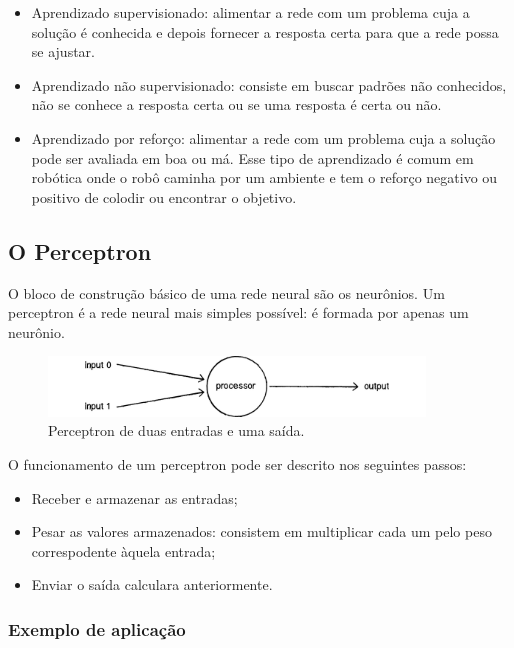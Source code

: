 \begin{itemize}
\item
  Aprendizado supervisionado: alimentar a rede com um problema cuja a solução é conhecida
  e depois fornecer a resposta certa para que a rede possa se ajustar.
\item
  Aprendizado não supervisionado: consiste em buscar padrões não conhecidos, não se conhece
  a resposta certa ou se uma resposta é certa ou não.
\item
  Aprendizado por reforço: alimentar a rede com um problema cuja a solução pode ser avaliada
  em boa ou má. Esse tipo de aprendizado é comum em robótica onde o robô caminha por um ambiente
  e tem o reforço negativo ou positivo de colodir ou encontrar o objetivo.
\end{itemize}

\subsection{O Perceptron}

O bloco de construção básico de uma rede neural são os neurônios. Um perceptron é a rede
neural mais simples possível: é formada por apenas um neurônio.

\begin{figure}[H]
\centering
\includegraphics[width=10cm]{figuras/rede_neural_perceptron}
\caption{Perceptron de duas entradas e uma saída.}\label{fig:rede_neural_perceptron}
\end{figure}


O funcionamento de um perceptron pode ser descrito nos seguintes passos:

\begin{itemize}
\item
  Receber e armazenar as entradas;
\item
  Pesar as valores armazenados: consistem em multiplicar cada um pelo peso correspodente àquela entrada;
\item
  Enviar o saída calculara anteriormente.
\end{itemize}

\subsubsection{Exemplo de aplicação}


